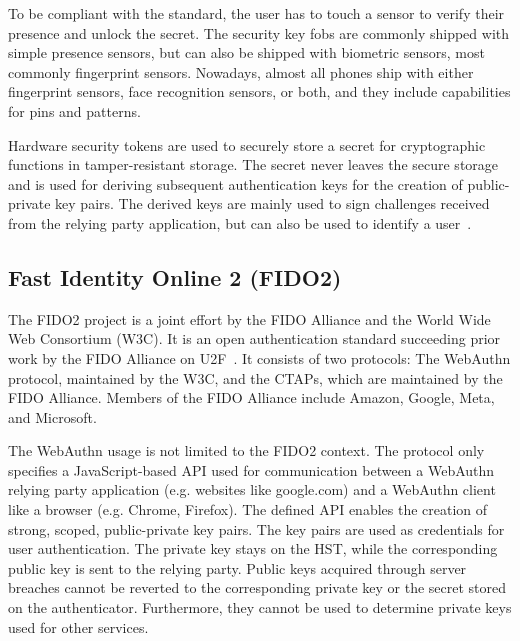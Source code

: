 \documentclass[runningheads]{llncs}
\begin{document}
To be compliant with the standard, the user has to touch a sensor to verify their presence and unlock the secret. The security key fobs are commonly shipped with simple presence sensors, but can also be shipped with biometric sensors, most commonly fingerprint sensors. Nowadays, almost all phones ship with either fingerprint sensors, face recognition sensors, or both, and they include capabilities for pins and patterns.

Hardware security tokens are used to securely store a secret for cryptographic functions in tamper-resistant storage. The secret never leaves the secure storage and is used for deriving subsequent authentication keys for the creation of public-private key pairs. The derived keys are mainly used to sign challenges received from the relying party application, but can also be used to identify a user~\cite{272198}.

\subsection{Fast Identity Online 2 (FIDO2)}
The FIDO2 project is a joint effort by the FIDO Alliance and the World Wide Web Consortium (W3C). It is an open authentication standard succeeding prior work by the FIDO Alliance on U2F~\cite{9152694}. It consists of two protocols: The WebAuthn protocol, maintained by the W3C, and the CTAPs, which are maintained by the FIDO Alliance. Members of the FIDO Alliance include Amazon, Google, Meta, and Microsoft.

The WebAuthn usage is not limited to the FIDO2 context. The protocol only specifies a JavaScript-based API used for communication between a WebAuthn relying party application (e.g. websites like google.com) and a WebAuthn client like a browser (e.g. Chrome, Firefox). The defined API enables the creation of strong, scoped, public-private key pairs. The key pairs are used as credentials for user authentication. The private key stays on the HST, while the corresponding public key is sent to the relying party. Public keys acquired through server breaches cannot be reverted to the corresponding private key or the secret stored on the authenticator. Furthermore, they cannot be used to determine private keys used for other services. 
\end{document}

